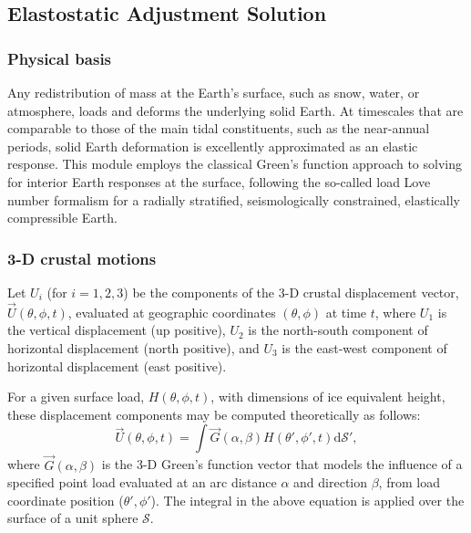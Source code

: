 
\subsection{Elastostatic Adjustment Solution} \label{sec:using-issm-capabilities-esa}
\subsubsection{Physical basis}
Any redistribution of mass at the Earth's surface, such as snow, water, or atmosphere, loads and deforms the underlying solid Earth. At timescales that are comparable to those of the main tidal constituents, such as the near-annual periods, solid Earth deformation is excellently approximated as an elastic response. This module employs the classical Green's function approach to solving for interior Earth responses at the surface, following the so-called load Love number formalism for a radially stratified, seismologically constrained, elastically compressible Earth.

\subsubsection{3-D crustal motions}
Let $U_i$ (for $i=1,2,3$) be the components of the 3-D crustal displacement vector, $\vec{U}(\theta,\phi,t)$, evaluated at geographic coordinates $(\theta,\phi)$ at time $t$, where $U_1$ is the vertical displacement (up positive), $U_2$ is the north-south component of horizontal displacement (north positive), and $U_3$ is the east-west component of horizontal displacement (east positive).

For a given surface load, $H(\theta,\phi,t)$, with dimensions of ice equivalent height, these displacement components may be computed theoretically as follows:
\begin{equation}
	\vec{U}(\theta,\phi,t) = \int{ \vec{G}(\alpha,\beta) H(\theta',\phi',t) \text{d}\mathcal{S}'},
\end{equation}
where $\vec{G}(\alpha,\beta)$ is the 3-D Green's function vector that models the influence of a specified point load evaluated at an arc distance $\alpha$ and direction $\beta$, from load coordinate position ($\theta',\phi'$). The integral in the above equation is applied over the surface of a unit sphere $\mathcal{S}$.

